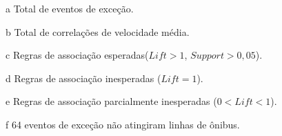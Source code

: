 \documentclass[
	12pt,				%
	oneside,			%
	a4paper,			%
	english,			%
	brazil				%
	]{abntex2ppgsi}
\begin{document}
{{{\begin{apendicesenv}
\begin{table}[!htb]
\begin{threeparttable}
\begin{tablenotes}
            \item[a] Total de eventos de exceção.
            \item[b] Total de correlações de velocidade média.
            \item[c] Regras de associação esperadas($Lift > 1$, $Support > 0,05$).
            \item[d] Regras de associação inesperadas ($Lift = 1$).
            \item[e] Regras de associação parcialmente inesperadas ($0 < Lift < 1$).
            \item[f] 64 eventos de exceção não atingiram linhas de ônibus.
        \end{tablenotes}
\end{threeparttable}
\end{table}



\end{apendicesenv}}}}
\end{document}
